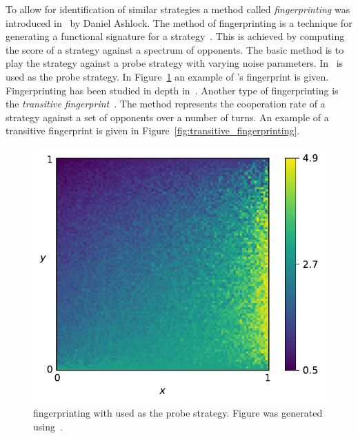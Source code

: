 To allow for identification of similar strategies a method called
\textit{fingerprinting} was introduced in~\cite{Ashlock2005} by Daniel Ashlock. The method of fingerprinting is a
technique for generating a functional signature for a
strategy~\cite{Ashlock2008}. This is achieved by computing the score of a
strategy against a spectrum of opponents. The basic method is to play the
strategy against a probe strategy with varying noise parameters.
In~\cite{Ashlock2005} \TitForTat is used as the probe strategy. In
Figure~\ref{fig:fingerprinting} an example of \Pavlov's fingerprint is given.
Fingerprinting has been studied in depth in~\cite{Ashlock2008, Ashlock2009,
Ashlock2010, Ashlock2006a}. Another type of fingerprinting is the
\textit{transitive fingerprint}~\cite{axelrodproject}.
The method represents the cooperation rate of a strategy against a set of opponents
over a number of turns. An example of a transitive fingerprint is given in
Figure~\ref{fig:transitive_fingerprinting}.

\begin{figure}[!hbtp]
    \centering
    \includegraphics[height=.3\textheight]{src/chapters/02/img/Win-Stay_Lose-Shift}
    \caption{\Pavlov fingerprinting with \TitForTat used as the probe strategy.
    Figure was generated using~\cite{axelrodproject}.}
    \label{fig:fingerprinting}
\end{figure}

